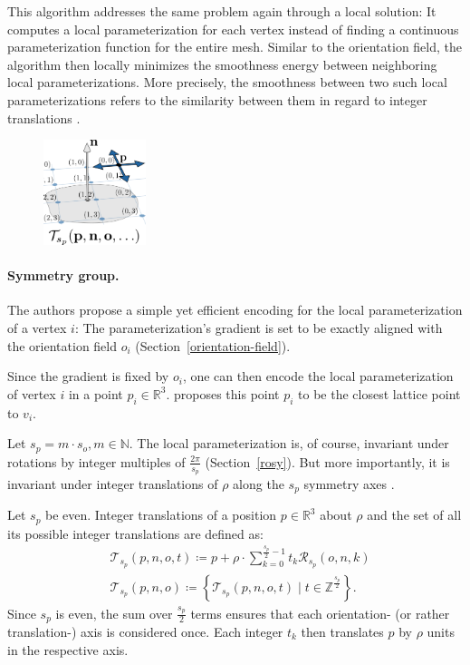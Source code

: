 \documentclass{ACGSeminar}
\begin{document}
This algorithm addresses the same problem again through a local solution: It computes a local parameterization for each vertex instead of finding a continuous parameterization function for the entire mesh. Similar to the orientation field, the algorithm then locally minimizes the smoothness energy between neighboring local parameterizations. More precisely, the smoothness between two such local parameterizations refers to the similarity between them in regard to integer translations \cite{jakob2015instant}.

\begin{figure}
	\includegraphics[width=3cm]{img/integer-translation.png}\par
	\label{fig:integer-translation}
\end{figure}

\paragraph{Symmetry group.}
The authors propose a simple yet efficient encoding for the local parameterization of a vertex $i$: The parameterization's gradient is set to be exactly aligned with the orientation field $o_i$ (Section~\ref{orientation-field}).

Since the gradient is fixed by $o_i$, one can then encode the local parameterization of vertex $i$ in a point $p_i \in \mathbb{R}^3$. \cite{jakob2015instant} proposes this point $p_i$ to be the closest lattice point to $v_i$.

Let $s_p = m \cdot s_o, m \in \mathbb{N}$. The local parameterization is, of course, invariant under rotations by integer multiples of $\frac{2\pi}{s_p}$ (Section~\ref{rosy}). But more importantly, it is invariant under integer translations of $\rho$ along the $s_p$ symmetry axes \cite{jakob2015instant}.\bigskip

Let $s_p$ be even. Integer translations of a position $p \in \mathbb{R}^3$ about $\rho$ and the set of all its possible integer translations are defined as:
\begin{equation*}
\begin{split}
	& \mathcal{T}_{s_p}(p,n,o,t) \coloneqq p + \rho \cdot \sum_{k=0}^{\frac{s_p}{2}-1} t_k \mathcal{R}_{s_p}(o,n,k)\\
	& \mathcal{T}_{s_p}(p,n,o) \coloneqq \left\{\mathcal{T}_{s_p}(p,n,o,t) \mid t \in \mathbb{Z}^{\frac{s_p}{2}}\right\}.
\end{split}
\end{equation*}
Since $s_p$ is even, the sum over $\frac{s_p}{2}$ terms ensures that each orientation- (or rather translation-) axis is considered once. Each integer $t_k$ then translates $p$ by $\rho$ units in the respective axis.
\end{document}

